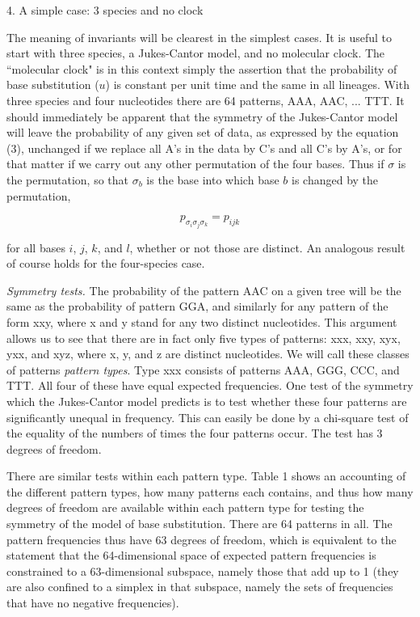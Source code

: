 \centerline{4. A simple case: 3 species and no clock}
\medskip

The meaning of invariants will be clearest in the simplest cases.  It is
useful to start with three species, a Jukes-Cantor model, and no
molecular clock.  The ``molecular clock" is in this context simply the
assertion that the probability of base substitution ($u$) is constant per unit
time and the same in all lineages.  With three species and four nucleotides
there are 64 patterns, AAA, AAC, ... TTT.  It should immediately be apparent
that the symmetry of the Jukes-Cantor model will leave the probability of
any given set of data, as expressed by the equation
(3), unchanged if we replace all A's in the data by C's and all C's by A's,
or for that matter if we carry out any other permutation of the four bases.
Thus if $\sigma$ is the permutation, so that $\sigma_b$ is the base into
which base $b$ is changed by the permutation,

\begin{equation} %
     p_{\sigma_i \sigma_j \sigma_k} = p_{ijk}
\end{equation}

for all bases $i$, $j$, $k$, and $l$, whether or not those are distinct.  An analogous
result of course holds for the four-species case.

\medskip

{\it Symmetry tests.}  The probability of the pattern AAC
on a given tree will be
the same as the probability of pattern GGA, and similarly for any pattern
of the form xxy, where x and y stand for any two distinct nucleotides.  This
argument allows us to see that there are in fact only five types of patterns:
xxx, xxy, xyx, yxx, and xyz, where x, y, and z are distinct nucleotides.  We
will call these classes of patterns {\it pattern types}.  Type xxx consists of
patterns AAA, GGG, CCC, and TTT.  All four of these have equal expected
frequencies.  One test of the symmetry which the Jukes-Cantor model predicts
is to test whether these four
patterns are significantly unequal in frequency.  This can easily be
done by a chi-square test of the equality of the numbers of times the four
patterns occur.  The test has 3 degrees of freedom.

There are similar tests within each pattern type.  Table 1 shows an
accounting of the different pattern types, how many patterns each
contains, and thus how many degrees of freedom are available within each
pattern type for testing the symmetry of the model of base substitution.
There are 64 patterns in all.  The pattern frequencies thus have 63
degrees of freedom, which is equivalent to the statement that the
64-dimensional space of expected pattern frequencies is constrained to a
63-dimensional subspace, namely those that add up to 1 (they are also
confined to a simplex in that subspace, namely the sets of frequencies
that have no negative frequencies).

